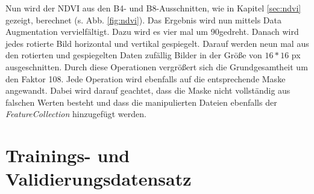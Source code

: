 \noindent
Nun wird der NDVI aus den B4- und B8-Ausschnitten, wie in Kapitel \ref{sec:ndvi} gezeigt, berechnet (s. Abb. \ref{fig:ndvi}). Das Ergebnis wird nun mittels Data Augmentation vervielfältigt. Dazu wird es vier mal um 90\degree gedreht. Danach wird jedes rotierte Bild horizontal und vertikal gespiegelt. Darauf werden neun mal aus den rotierten und gespiegelten Daten zufällig Bilder in der Größe von $16*16$ px ausgeschnitten. Durch diese Operationen vergrößert sich die Grundgesamtheit um den Faktor 108. Jede Operation wird ebenfalls auf die entsprechende Maske angewandt. Dabei wird darauf geachtet, dass die Maske nicht vollständig aus falschen Werten besteht und dass die manipulierten Dateien ebenfalls der \textit{FeatureCollection} hinzugefügt werden.

\section{Trainings- und Validierungsdatensatz}\label{sec:dataset}

